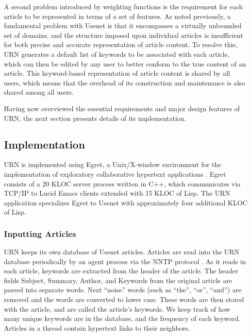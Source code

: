 A second problem introduced by weighting functions is the requirement for
each article to be represented in terms of a set of features.  As noted
previously, a fundamental problem with Usenet is that it encompasses a
virtually unbounded set of domains, and the structure imposed upon
individual articles is insufficient for both precise and accurate
representation of article content.  To resolve this, URN generates a
default list of keywords to be associated with each article, which can then
be edited by any user to better conform to the true content of an article.
This keyword-based representation of article content is shared by all
users, which means that the overhead of its construction and maintenance is
also shared among all users.  

Having now overviewed the essential requirements and major design features
of URN, the next section presents details of its implementation.


\subsection{Implementation}

URN is implemented using Egret, a Unix/X-window environment for the
implementation of exploratory collaborative hypertext applications
\cite{csdl-92-01,csdl-93-09}.  Egret consists of a 20 KLOC server process
written in C++, which communicates via TCP/IP to Lucid Emacs clients
extended with 15 KLOC of Lisp. The URN application specializes Egret to
Usenet with approximately four additional KLOC of Lisp.

\subsubsection{Inputting Articles}

URN keeps its own database of Usenet articles. Articles are read into the
URN database periodically by an agent process via the NNTP protocol
\cite{rfc977}.  As it reads in each article, keywords are extracted from
the header of the article. The header fields Subject, Summary, Author, and
Keywords from the original article are parsed into separate words. Next
``noise'' words (such as ``the'', ``or'', ``and'') are removed and the words
are converted to lower case.  These words are then stored with the article,
and are called the article's keywords. We keep track of how many unique
keywords are in the database, and the frequency of each keyword. Articles
in a thread contain hypertext links to their neighbors.

